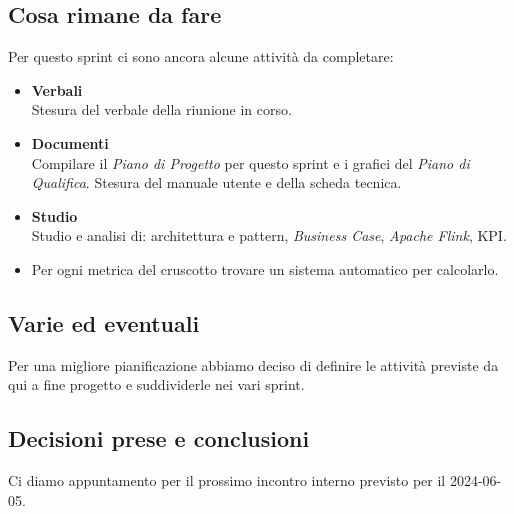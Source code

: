 \documentclass[italian,12pt]{article}
\begin{document}
\subsection{Cosa rimane da fare}
Per questo sprint ci sono ancora alcune attività da completare:
\begin{itemize}
	\item \textbf{Verbali} \\
		  Stesura del verbale della riunione in corso.
	\item \textbf{Documenti} \\
		  Compilare il \textit{Piano di Progetto} per questo sprint e i grafici del \textit{Piano di Qualifica}. Stesura del manuale utente e della scheda tecnica. 
	\item \textbf{Studio} \\
		  Studio e analisi di: architettura e pattern, \textit{Business Case}, \textit{Apache Flink}, KPI.
	\item Per ogni metrica del cruscotto trovare un sistema automatico per calcolarlo.
\end{itemize}

\subsection{Varie ed eventuali}
Per una migliore pianificazione abbiamo deciso di definire le attività previste da qui a fine progetto e suddividerle nei vari sprint.

\subsection{Decisioni prese e conclusioni}
Ci diamo appuntamento per il prossimo incontro interno previsto per il 2024-06-05.
\end{document}
